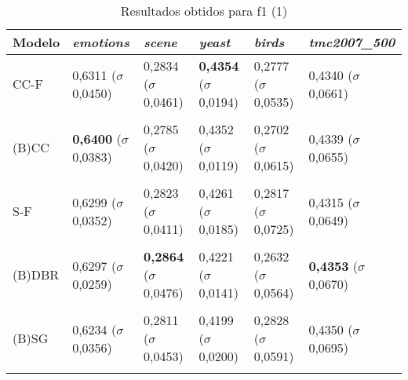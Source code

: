 
\begin{table}[htbp]
	\centering
	\caption{Resultados obtidos para f1 (1)}
		\begin{tabular}
        { p{0.88in} p{0.88in} p{0.88in} p{0.88in} p{0.88in} p{0.88in} }
        
        \hline
Modelo & \textit{emotions} & \textit{scene} & \textit{yeast} & \textit{birds} & \textit{tmc2007\_500} \\ 
\hline

CC-F & 0,6311 \newline ($\sigma$ 0,0450) & 0,2834 \newline ($\sigma$ 0,0461) & \textbf{0,4354} \newline ($\sigma$ 0,0194) & 0,2777 \newline ($\sigma$ 0,0535) & 0,4340 \newline ($\sigma$ 0,0661) \\ \\
(B)CC & \textbf{0,6400} \newline ($\sigma$ 0,0383) & 0,2785 \newline ($\sigma$ 0,0420) & 0,4352 \newline ($\sigma$ 0,0119) & 0,2702 \newline ($\sigma$ 0,0615) & 0,4339 \newline ($\sigma$ 0,0655) \\ \\
S-F & 0,6299 \newline ($\sigma$ 0,0352) & 0,2823 \newline ($\sigma$ 0,0411) & 0,4261 \newline ($\sigma$ 0,0185) & 0,2817 \newline ($\sigma$ 0,0725) & 0,4315 \newline ($\sigma$ 0,0649) \\ \\
(B)DBR & 0,6297 \newline ($\sigma$ 0,0259) & \textbf{0,2864} \newline ($\sigma$ 0,0476) & 0,4221 \newline ($\sigma$ 0,0141) & 0,2632 \newline ($\sigma$ 0,0564) & \textbf{0,4353} \newline ($\sigma$ 0,0670) \\ \\
(B)SG & 0,6234 \newline ($\sigma$ 0,0356) & 0,2811 \newline ($\sigma$ 0,0453) & 0,4199 \newline ($\sigma$ 0,0200) & 0,2828 \newline ($\sigma$ 0,0591) & 0,4350 \newline ($\sigma$ 0,0695) \\ \\

\end{tabular}
\end{table}
